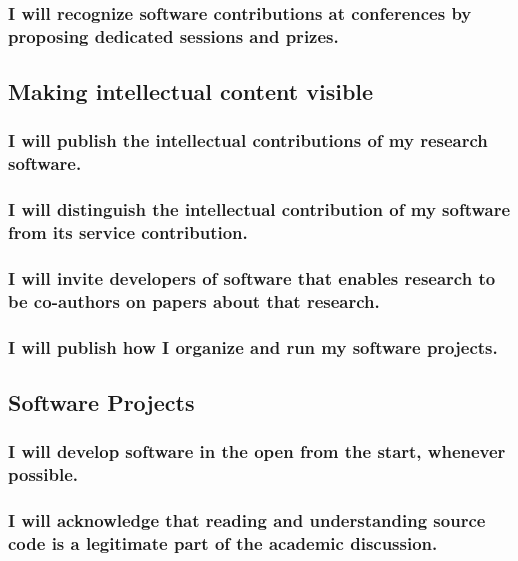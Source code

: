 \documentclass[a4paper,UKenglish]{dagman}
\renewcommand{\paragraph}[1]{\subsubsection*{#1}\xspace}
\begin{document}
\paragraph{I will recognize software contributions at conferences by proposing dedicated sessions and prizes.}


\subsection{Making intellectual content visible}

\paragraph{I will publish the intellectual contributions of my research software.}

\paragraph{I will distinguish the intellectual contribution of my software from its service contribution.}

\paragraph{I will invite developers of software that enables research to be co-authors on papers about that research.}

\paragraph{I will publish how I organize and run my software projects.}


\subsection{Software Projects}

\paragraph{I will develop software in the open from the start, whenever possible.}

\paragraph{I will acknowledge that reading and understanding source code is a legitimate part of the academic discussion.}
\end{document}
